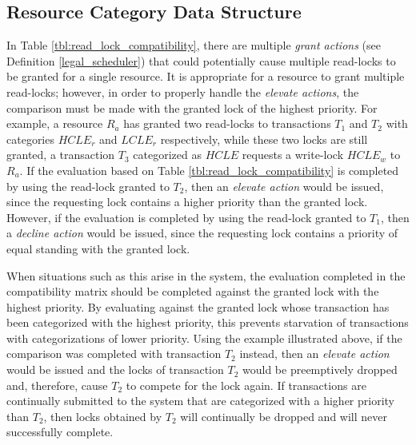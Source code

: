 \subsection{Resource Category Data Structure}
\label{RCDS}

In Table \ref{tbl:read_lock_compatibility}, there are multiple \textit{grant actions} (see Definition \ref{legal_scheduler}) that could potentially cause multiple read-locks to be granted for a single resource. It is appropriate for a resource to grant multiple read-locks; however, in order to properly handle the \textit{elevate actions}, the comparison must be made with the granted lock of the highest priority. For example, a resource $R_{a}$ has granted two read-locks to transactions $T_{1}$ and $T_{2}$ with categories $HCLE_{r}$ and $LCLE_{r}$ respectively, while these two locks are still granted, a transaction $T_{3}$ categorized as $HCLE$ requests a write-lock $HCLE_{w}$ to $R_{a}$. If the evaluation based on Table \ref{tbl:read_lock_compatibility} is completed by using the read-lock granted to $T_{2}$, then an \textit{elevate action} would be issued, since the requesting lock contains a higher priority than the granted lock. However, if the evaluation is completed by using the read-lock granted to $T_{1}$, then a \textit{decline action} would be issued, since the requesting lock contains a priority of equal standing with the granted lock.

When situations such as this arise in the system, the evaluation completed in the compatibility matrix should be completed against the granted lock with the highest priority. By evaluating against the granted lock whose transaction has been categorized with the highest priority, this prevents starvation of transactions with categorizations of lower priority. Using the example illustrated above, if the comparison was completed with transaction $T_{2}$ instead, then an \textit{elevate action} would be issued and the locks of transaction $T_{2}$ would be preemptively dropped and, therefore, cause $T_{2}$ to compete for the lock again. If transactions are continually submitted to the system that are categorized with a higher priority than $T_{2}$, then locks obtained by $T_{2}$ will continually be dropped and will never successfully complete.


